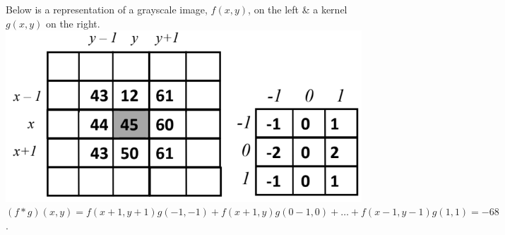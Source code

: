 \documentclass[11pt,a4paper]{article}
\begin{document}
Below is a representation of a grayscale image, $f(x,y)$, on the left \& a kernel $g(x,y)$ on the right.
\includegraphics[scale=.3]{img/2dconvolution.png}\\
$(f*g)(x,y)=f(x+1,y+1)g(-1,-1)+f(x+1,y)g(0-1,0)+\dots+f(x-1,y-1)g(1,1)=-68$.\\
\end{document}
